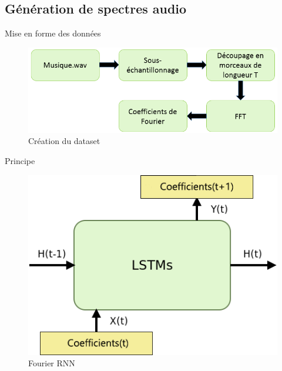 \documentclass{beamer}
\begin{document}
\subsection{Génération de spectres audio}

\begin{frame}{Mise en forme des données}
\begin{figure}
\begin{center}
\includegraphics[scale = 0.57]{images/pipeline.png}
\caption{Création du dataset}
\end{center}
\end{figure}
\end{frame}

\begin{frame}{Principe}
\begin{figure}
\begin{center}
\includegraphics[scale=0.5]{images/fourier.png}
\caption{Fourier RNN}
\end{center}
\end{figure}
\end{frame}
\end{document}
